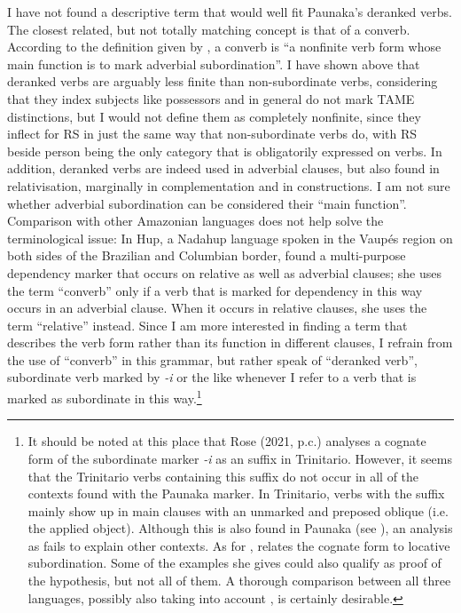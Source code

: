 I have not found a descriptive term that would well fit Paunaka’s deranked verbs. The closest related, but not totally matching concept is that of a converb. According to the definition given by \citet[3]{Haspelmath1995}, a converb is “a nonfinite verb form whose main function is to mark adverbial subordination”. I have shown above that deranked verbs are arguably less finite than non-subordinate verbs, considering that they index subjects like possessors and in general do not mark TAME distinctions, but I would not define them as completely nonfinite, since they inflect for RS in just the same way that non-subordinate verbs do, with RS beside person being the only category that is obligatorily expressed on verbs. In addition, deranked verbs are indeed used in adverbial clauses, but also found in relativisation, marginally in complementation and in  constructions. I am not sure whether adverbial subordination can be considered their “main function”. Comparison with other Amazonian languages does not help solve the terminological issue: In Hup, a Nadahup language spoken in the Vaupés region on both sides of the Brazilian and Columbian border, \citet[]{Epps2009} found a multi-purpose dependency marker that occurs on relative as well as adverbial clauses; she uses the term “converb” only if a verb that is marked for dependency in this way occurs in an adverbial clause. When it occurs in relative clauses, she uses the term “relative” instead. Since I am more interested in finding a term that describes the verb form rather than its function in different clauses, I refrain from the use of “converb” in this grammar, but rather speak of “deranked verb”, subordinate verb marked by \textit{-i} or the like whenever I refer to a verb that is marked as subordinate in this way.\footnote{It should be noted at this place that Rose (2021, p.c.) analyses a cognate form of the subordinate marker \textit{-i} as an  suffix in Trinitario. However, it seems that the Trinitario verbs containing this suffix do not occur in all of the contexts found with the Paunaka marker. In Trinitario, verbs with the suffix mainly show up in main clauses with an unmarked and preposed oblique (i.e. the applied object). Although this is also found in Paunaka (see ), an analysis as  fails to explain other contexts. As for , \citet{Danielsen2007,Danielsen2011a} relates the cognate form to locative subordination. Some of the examples she gives could also qualify as proof of the  hypothesis, but not all of them. A thorough comparison between all three languages, possibly also taking into account , is certainly desirable.}

